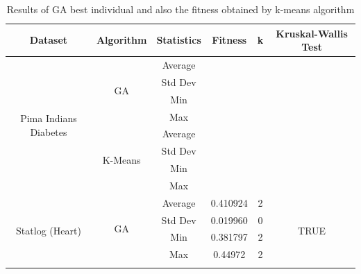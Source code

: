 \documentclass[journal]{IEEEtran}
\begin{document}
\begin{table}[]
	\centering
	\caption{Results of GA best individual and also the fitness obtained by k-means algorithm}
	\label{results-ga-and-kmeans}
	\begin{tabular}{|c|c|c|c|c|c|}
		\hline
		\textbf{Dataset}                       & \textbf{Algorithm}       & \textbf{Statistics} & \textbf{Fitness} & \textbf{k}               & Kruskal-Wallis Test   \\ \hline
		\multirow{8}{*}{Pima Indians Diabetes} & \multirow{4}{*}{GA}      & Average             &                  &                          & \multirow{8}{*}{}     \\ \cline{3-5}
		&                          & Std Dev             &                  &                          &                       \\ \cline{3-5}
		&                          & Min                 &                  &                          &                       \\ \cline{3-5}
		&                          & Max                 &                  &                          &                       \\ \cline{2-5}
		& \multirow{4}{*}{K-Means} & Average             &                  &                          &                       \\ \cline{3-5}
		&                          & Std Dev             &                  &                          &                       \\ \cline{3-5}
		&                          & Min                 &                  &                          &                       \\ \cline{3-5}
		&                          & Max                 &                  &                          &                       \\ \hline
		\multirow{8}{*}{Statlog (Heart)}       & \multirow{4}{*}{GA}      & Average             & 0.410924         & 2                        & \multirow{8}{*}{TRUE} \\ \cline{3-5}
		&                          & Std Dev             & 0.019960         & 0                        &                       \\ \cline{3-5}
		&                          & Min                 & 0.381797         & 2                        &                       \\ \cline{3-5}
		&                          & Max                 & 0.44972          & 2                        &                       \\ \cline{2-5}

\end{tabular}
\end{table}
\end{document}
